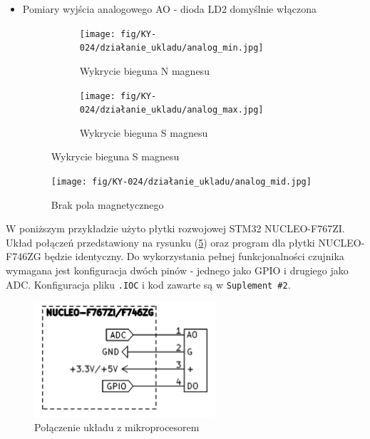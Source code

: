 \documentclass[11pt, a4paper]{article}
\begin{document}
\begin{itemize}
\item{Pomiary wyjścia analogowego AO - dioda LD2 domyślnie włączona}
\begin{figure}[h]
\centering
\begin{subfigure}{.5\textwidth}
\centering
\texttt{[image: fig/KY-024/działanie\_ukladu/analog\_min.jpg]}
\caption{Wykrycie bieguna N magnesu}
\label{fig:_analog_min_def_on}
\end{subfigure}%
\begin{subfigure}{.5\textwidth}
\centering
\texttt{[image: fig/KY-024/działanie\_ukladu/analog\_max.jpg]}
\caption{Wykrycie bieguna S magnesu}
\label{fig:_analog_max_def_on}
\end{subfigure}
\label{fig:miernik3}
\end{figure}

\begin{figure}[H]
    \centering
    \texttt{[image: fig/KY-024/działanie\_ukladu/analog\_mid.jpg]}
    \caption{Brak pola magnetycznego}
    \label{fig:_analog_mid_def_on}
\end{figure}
\end{itemize}

\newpage

W poniższym przykładzie użyto płytki rozwojowej STM32 NUCLEO-F767ZI. Układ połączeń przedstawiony na rysunku (\ref{fig:_polaczenie_ukladu}) oraz program dla płytki NUCLEO-F746ZG będzie identyczny. Do wykorzystania pełnej funkcjonalności czujnika wymagana jest konfiguracja dwóch pinów - jednego jako GPIO i drugiego jako ADC. Konfiguracja pliku \texttt{.IOC} i kod zawarte są w \texttt{Suplement \#2}.
\vspace{0.25cm}
\begin{figure}[H]
    \centering
    \includegraphics[width=0.6\textwidth]{fig/KY-024/polaczenie_modulu/polaczenie_nucleo.png}
    \caption{Połączenie układu z mikroprocesorem}
    \label{fig:_polaczenie_ukladu}
\end{figure}
\vspace{0.25cm}
\end{document}

